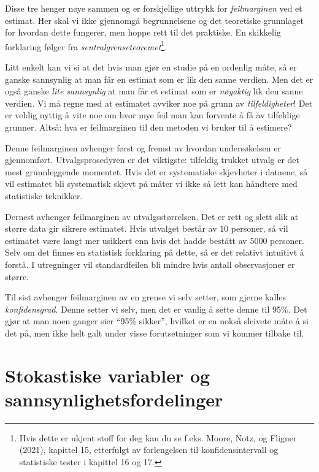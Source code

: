 \documentclass[
  norsk,
  letterpaper,
  DIV=11,
  numbers=noendperiod]{scrreprt}
\theoremstyle{definition}
\theoremstyle{remark}
\begin{document}
Disse tre henger nøye sammen og er forskjellige uttrykk for
\emph{feilmarginen} ved et estimat. Her skal vi ikke gjennomgå
begrunnelsene og det teoretiske grunnlaget for hvordan dette fungerer,
men hoppe rett til det praktiske. En skikkelig forklaring følger fra
\emph{sentralgrenseteoremet}\footnote{Hvis dette er ukjent stoff for deg
  kan du se f.eks. Moore, Notz, og Fligner (2021), kapittel 15,
  etterfulgt av forlengelsen til konfidensintervall og statistiske
  tester i kapittel 16 og 17.}.

Litt enkelt kan vi si at det hvis man gjør en studie på en ordenlig
måte, så er ganske sannsynlig at man får en estimat som er lik den sanne
verdien. Men det er også ganske \emph{lite sannsynlig} at man får et
estimat som er \emph{nøyaktig} lik den sanne verdien. Vi må regne med at
estimatet avviker noe på grunn av \emph{tilfeldigheter}! Det er veldig
nyttig å vite noe om hvor mye feil man kan forvente å få av tilfeldige
grunner. Altså: hva er feilmarginen til den metoden vi bruker til å
estimere?

Denne feilmarginen avhenger først og fremst av hvordan undersøkelsen er
gjennomført. Utvalgsprosedyren er det viktigste: tilfeldig trukket
utvalg er det mest grunnleggende momentet. Hvis det er systematiske
skjevheter i dataene, så vil estimatet bli systematisk skjevt på måter
vi ikke så lett kan håndtere med statistiske teknikker.

Dernest avhenger feilmarginen av utvalgsstørrelsen. Det er rett og slett
slik at større data gir sikrere estimatet. Hvis utvalget består av 10
personer, så vil estimatet være langt mer usikkert enn hvis det hadde
bestått av 5000 personer. Selv om det finnes en statistisk forklaring på
dette, så er det relativt intuitivt å forstå. I utregninger vil
standardfeilen bli mindre hvis antall observasjoner er større.

Til sist avhenger feilmarginen av en grense vi selv setter, som gjerne
kalles \emph{konfidensgrad}. Denne setter vi selv, men det er vanlig å
sette denne til 95\%. Det gjør at man noen ganger sier ``95\% sikker'',
hvilket er en nokså sleivete måte å si det på, men ikke helt galt under
visse forutsetninger som vi kommer tilbake til.

\section{Stokastiske variabler og
sannsynlighetsfordelinger}\label{stokastiske-variabler-og-sannsynlighetsfordelinger}
\end{document}
